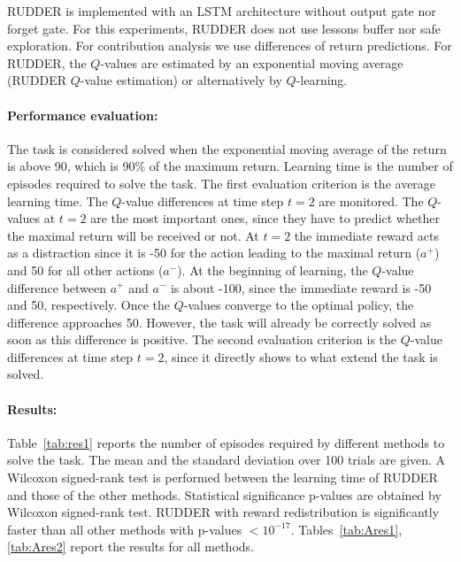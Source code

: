 \documentclass{article}
\begin{document}
\begin{appendices}
RUDDER is implemented with an LSTM architecture 
without output gate nor forget gate. For this experiments, 
RUDDER does not use lessons buffer nor safe exploration. 
For contribution analysis we use differences of return predictions.
For RUDDER, the $Q$-values are estimated by an exponential moving average 
(RUDDER $Q$-value estimation) or alternatively by $Q$-learning. 

\paragraph{ Performance evaluation: }
The task is considered solved when the exponential moving average of the return 
is above 90, which is 90\% of the maximum return. 
Learning time is the number of episodes required to solve the task. 
The first evaluation criterion is the average learning time.
The $Q$-value differences at time step $t=2$ are monitored. 
The $Q$-values at $t=2$ are the most important ones, since they have to predict 
whether the maximal return will be received or not.
At $t=2$ the immediate reward acts as a distraction since it is -50 for the action leading  
to the maximal return ($a^+$) and 50 for all other actions ($a^-$).  
At the beginning of learning, the $Q$-value difference 
between $a^+$ and $a^-$ is about -100, since the immediate reward is -50 and 50, respectively.
Once the $Q$-values converge to the optimal policy, the difference approaches 50. 
However, the task will already be correctly solved as soon as this difference is positive.
The second evaluation criterion is the $Q$-value differences at time step $t=2$,
since it directly shows to what extend the task is solved.

\paragraph{ Results: }
Table~\ref{tab:res1} reports the number of episodes required by different
methods to solve the task. 
The mean and the standard deviation over 100 trials are given.
A Wilcoxon signed-rank test is performed between the learning time of RUDDER 
and those of the other methods.
Statistical significance p-values are obtained by Wilcoxon signed-rank test.
RUDDER with reward redistribution is significantly faster than all other methods with p-values $<10^{-17}$. 
Tables~\ref{tab:Ares1},\ref{tab:Ares2} report the results for all methods.



\end{appendices}
\end{document}
